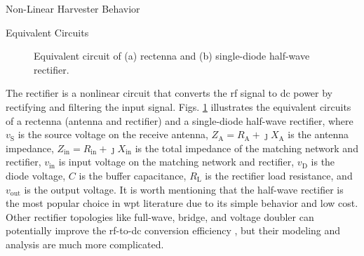 \begin{section}{}
	\begin{subsection}{Non-Linear Harvester Behavior}
		\begin{subsubsection}{Equivalent Circuits}
			\begin{figure}[H]
				\centering
				\subfloat[Rectenna]{
					\resizebox{0.45\columnwidth}{!}{
						
					}
					\label{fg:rectenna}
				}
				\caption{
					Equivalent circuit of (a) rectenna and (b) single-diode half-wave rectifier.
				}
				\label{fg:harvester_circuit}
			\end{figure}
			The rectifier is a nonlinear circuit that converts the \gls{rf} signal to \gls{dc} power by rectifying and filtering the input signal.
			Figs. \ref{fg:harvester_circuit} illustrates the equivalent circuits of a rectenna (antenna and rectifier) and a single-diode half-wave rectifier, where $v_{\mathrm{S}}$ is the source voltage on the receive antenna, $Z_{\mathrm{A}} = R_{\mathrm{A}} + \jmath X_{\mathrm{A}}$ is the antenna impedance, $Z_{\mathrm{in}} = R_{\mathrm{in}} + \jmath X_{\mathrm{in}}$ is the total impedance of the matching network and rectifier, $v_{\mathrm{in}}$ is input voltage on the matching network and rectifier, $v_{\mathrm{D}}$ is the diode voltage, $C$ is the buffer capacitance, $R_{\mathrm{L}}$ is the rectifier load resistance, and $v_{\mathrm{out}}$ is the output voltage.
			It is worth mentioning that the half-wave rectifier is the most popular choice in \gls{wpt} literature due to its simple behavior and low cost.
			Other rectifier topologies like full-wave, bridge, and voltage doubler can potentially improve the \gls{rf}-to-\gls{dc} conversion efficiency \cite{Rotenberg2020}, but their modeling and analysis are much more complicated.
		\end{subsubsection}


\end{subsection}
\end{section}

